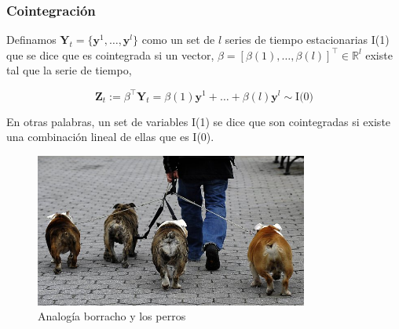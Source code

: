 \documentclass{beamer}
\begin{document}
            \begin{frame}  
            \frametitle{Cointegración} 
            Definamos $\mathbf{Y}_t = \{\mathbf{y}^1, \dots, \mathbf{y}^l\}$
            como un set de $l$ series de tiempo estacionarias
            I(1) que se dice que es cointegrada si un vector,
            $\beta=[\beta(1),\dots,\beta(l)]^\intercal \in \mathbb{R}^l$  existe tal que la serie de tiempo,
            
            \begin{equation}
            \mathbf{Z}_t:= \beta^\intercal \mathbf{Y}_t = \beta(1) \mathbf{y}^1 + \dots + \beta(l) \mathbf{y}^l \sim
            \text{I(0)}
            \end{equation}
            
            En otras palabras, un set de variables I(1) se dice que son cointegradas si
            existe una combinación lineal de ellas que es I(0).
            \end{frame}
        
            \begin{frame}  
            \begin{figure}[h]
                \centering
                \includegraphics[width=0.8\textwidth]{img/dogs}
                \caption{Analogía borracho y los perros}
                \label{fig:cpu_gpu_arch}
            \end{figure}
            \end{frame}
\end{document}
